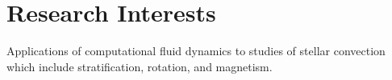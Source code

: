 \section{Research Interests}

Applications of computational fluid dynamics to studies of stellar convection which include stratification, rotation, and magnetism.

